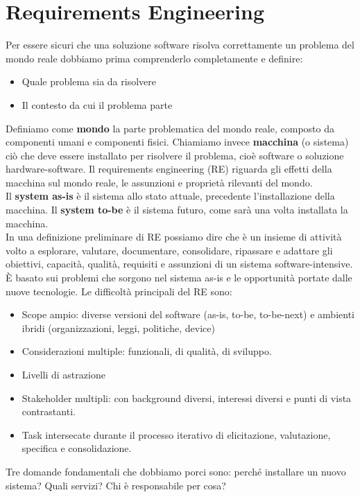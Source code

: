 \documentclass[../main.tex]{subfiles}
\begin{document}
\chapter{Requirements Engineering}
Per essere sicuri che una soluzione software risolva correttamente un problema del mondo reale dobbiamo prima comprenderlo completamente e definire: 
\begin{itemize}
	\item Quale problema sia da risolvere
	\item Il contesto da cui il problema parte
\end{itemize}
Definiamo come \textbf{mondo} la parte problematica del mondo reale, composto da componenti umani e componenti fisici.
Chiamiamo invece \textbf{macchina} (o sistema) ciò che deve essere installato per risolvere il problema, cioè software o soluzione hardware-software.
Il requirements engineering (RE) riguarda gli effetti della macchina sul mondo reale, le assunzioni e proprietà rilevanti del mondo.
\\ 
Il \textbf{system as-is} è il sistema allo stato attuale, precedente l'installazione della macchina.
Il \textbf{system to-be} è il sistema futuro, come sarà una volta installata la macchina.
\\
In una definizione preliminare di RE possiamo dire che è un insieme di attività volto a esplorare, valutare, documentare, consolidare, ripassare e adattare gli obiettivi, capacità, qualità, requisiti e assunzioni di un sistema software-intensive.
È basato sui problemi che sorgono nel sistema as-is e le opportunità portate dalle nuove tecnologie.
Le difficoltà principali del RE sono:
\begin{itemize}
	\item Scope ampio: diverse versioni del software (as-is, to-be, to-be-next) e ambienti ibridi (organizzazioni, leggi, politiche, device)
	\item Considerazioni multiple: funzionali, di qualità, di sviluppo.
	\item Livelli di astrazione
	\item Stakeholder multipli: con background diversi, interessi diversi e punti di vista contrastanti.
	\item Task intersecate durante il processo iterativo di elicitazione, valutazione, specifica e consolidazione.
\end{itemize}
Tre domande fondamentali che dobbiamo porci sono: perché installare un nuovo sistema? Quali servizi? Chi è responsabile per cosa?
\end{document}
